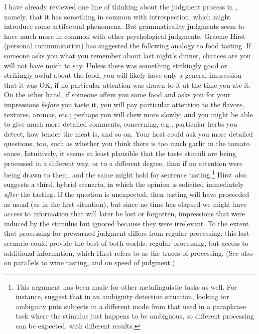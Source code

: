I have already reviewed one line of thinking about the judgment process in , namely, that it has something in common with introspection, which might introduce some artifactual phenomena. But grammaticality judgments seem to have much more in common with other psychological judgments. Graeme Hirst (personal communication) has suggested the following analogy to food tasting. If someone asks you what you remember about last night's dinner, chances are you will not have much to say. Unless there was something strikingly good or strikingly awful about the food, you will likely have only a general impression that it was OK, if no particular attention was drawn to it at the time you ate it. On the other hand, if someone offers you some food and asks you for your impressions \textit{before} you taste it, you will pay particular attention to the flavors, textures, aromas, etc.; perhaps you will chew more slowly; and you might be able to give much more detailed comments, concerning, e.g., particular herbs you detect, how
tender the meat is, and so on. Your host could ask you more detailed questions, too, such as whether you think there is too much garlic in the tomato sauce. Intuitively, it seems at least plausible that the taste stimuli are being processed in a different way, or to a different degree, than if no attention were being drawn to them, and the same might hold for sentence tasting.\footnote{ This argument has been made for other metalinguistic tasks as well. For instance, \citet{KessEtAl1983} suggest that in an ambiguity detection situation, looking for ambiguity puts subjects in a different mode from that used in a paraphrase task where the stimulus just happens to be ambiguous, so different processing can be expected, with different results.}
 Hirst also suggests a third, hybrid scenario, in which the opinion is solicited immediately \textit{after} the tasting. If the question is unexpected, then tasting will have proceeded as usual (as in the first situation), but since no time has elapsed we might have access to information that will later be lost or forgotten, impressions that were induced by the stimulus but ignored because they were irrelevant. To the extent that processing for prewarned judgment differs from regular processing, this last scenario could provide the best of both worlds: regular processing, but access to additional information, which Hirst refers to as the traces of processing. (See also  on parallels to wine tasting, and  on speed of judgment.)

